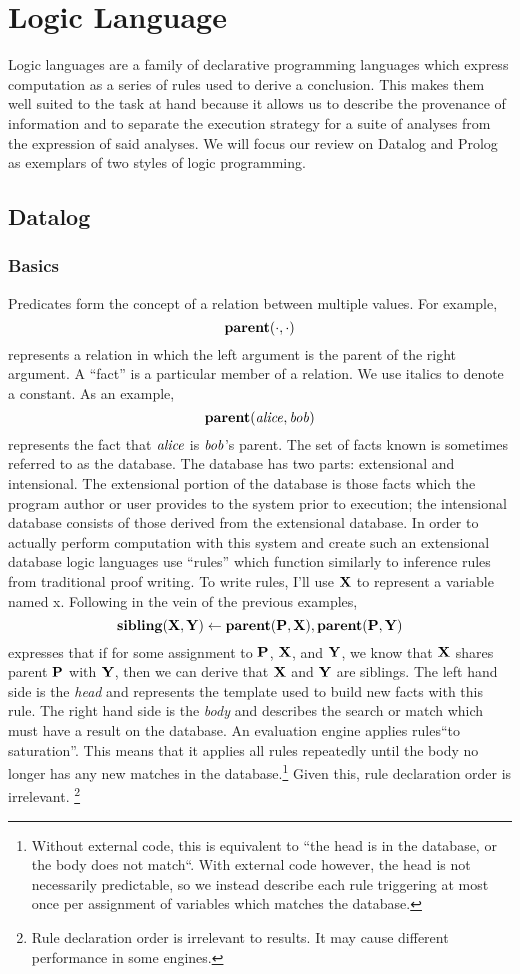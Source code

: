\section{Logic Language}
Logic languages are a family of declarative programming languages which express computation as a series of rules used to derive a conclusion.
This makes them well suited to the task at hand because it allows us to describe the provenance of information and to separate the execution strategy for a suite of analyses from the expression of said analyses.
We will focus our review on Datalog and Prolog as exemplars of two styles of logic programming.
\subsection{Datalog}
\label{sec:fchain}
\subsubsection{Basics}
Predicates form the concept of a relation between multiple values.
For example,
\[
        {\bf parent}(\cdot, \cdot)
\]
represents a relation in which the left argument is the parent of the right argument.
A ``fact'' is a particular member of a relation.
We use italics to denote a constant.
As an example,
\[
        {\bf parent}({\it alice}, {\it bob})
\]
represents the fact that ${\it alice}$ is ${\it bob}$'s parent.
The set of facts known is sometimes referred to as the database.
The database has two parts: extensional and intensional.
The extensional portion of the database is those facts which the program author or user provides to the system prior to execution; the intensional database consists of those derived from the extensional database.
In order to actually perform computation with this system and create such an extensional database logic languages use ``rules'' which function similarly to inference rules from traditional proof writing.
To write rules, I'll use ${\bf X}$ to represent a variable named x.
Following in the vein of the previous examples,
\[
        {\bf sibling}({\bf X}, {\bf Y}) \leftarrow {\bf parent}({\bf P}, {\bf X}), {\bf parent}({\bf P}, {\bf Y})
\]
expresses that if for some assignment to ${\bf P}$, ${\bf X}$, and ${\bf Y}$, we know that ${\bf X}$ shares parent ${\bf P}$ with ${\bf Y}$, then we can derive that ${\bf X}$ and ${\bf Y}$ are siblings.
The left hand side is the \emph{head} and represents the template used to build new facts with this rule.
The right hand side is the \emph{body} and describes the search or match which must have a result on the database.
An evaluation engine applies rules``to saturation''.
This means that it applies all rules repeatedly until the body no longer has any new matches in the database.\footnote {
Without external code, this is equivalent to ``the head is in the database, or the body does not match``. With external code however, the head is not necessarily predictable, so we instead describe each rule triggering at most once per assignment of variables which matches the database.
}
Given this, rule declaration order is irrelevant.
\footnote{
  Rule declaration order is irrelevant to results.
  It may cause different performance in some engines.
}
